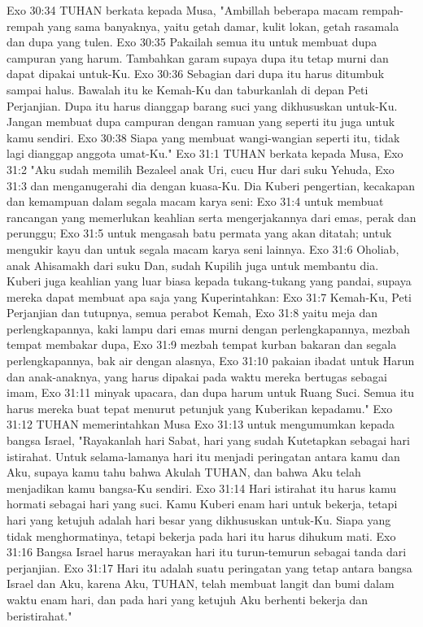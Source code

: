 Exo 30:34  TUHAN berkata kepada Musa, "Ambillah beberapa macam rempah-rempah yang sama banyaknya, yaitu getah damar, kulit lokan, getah rasamala dan dupa yang tulen.
Exo 30:35  Pakailah semua itu untuk membuat dupa campuran yang harum. Tambahkan garam supaya dupa itu tetap murni dan dapat dipakai untuk-Ku.
Exo 30:36  Sebagian dari dupa itu harus ditumbuk sampai halus. Bawalah itu ke Kemah-Ku dan taburkanlah di depan Peti Perjanjian. Dupa itu harus dianggap barang suci yang dikhususkan untuk-Ku. Jangan membuat dupa campuran dengan ramuan yang seperti itu juga untuk kamu sendiri.
Exo 30:38  Siapa yang membuat wangi-wangian seperti itu, tidak lagi dianggap anggota umat-Ku."
Exo 31:1  TUHAN berkata kepada Musa,
Exo 31:2  "Aku sudah memilih Bezaleel anak Uri, cucu Hur dari suku Yehuda,
Exo 31:3  dan menganugerahi dia dengan kuasa-Ku. Dia Kuberi pengertian, kecakapan dan kemampuan dalam segala macam karya seni:
Exo 31:4  untuk membuat rancangan yang memerlukan keahlian serta mengerjakannya dari emas, perak dan perunggu;
Exo 31:5  untuk mengasah batu permata yang akan ditatah; untuk mengukir kayu dan untuk segala macam karya seni lainnya.
Exo 31:6  Oholiab, anak Ahisamakh dari suku Dan, sudah Kupilih juga untuk membantu dia. Kuberi juga keahlian yang luar biasa kepada tukang-tukang yang pandai, supaya mereka dapat membuat apa saja yang Kuperintahkan:
Exo 31:7  Kemah-Ku, Peti Perjanjian dan tutupnya, semua perabot Kemah,
Exo 31:8  yaitu meja dan perlengkapannya, kaki lampu dari emas murni dengan perlengkapannya, mezbah tempat membakar dupa,
Exo 31:9  mezbah tempat kurban bakaran dan segala perlengkapannya, bak air dengan alasnya,
Exo 31:10  pakaian ibadat untuk Harun dan anak-anaknya, yang harus dipakai pada waktu mereka bertugas sebagai imam,
Exo 31:11  minyak upacara, dan dupa harum untuk Ruang Suci. Semua itu harus mereka buat tepat menurut petunjuk yang Kuberikan kepadamu."
Exo 31:12  TUHAN memerintahkan Musa
Exo 31:13  untuk mengumumkan kepada bangsa Israel, "Rayakanlah hari Sabat, hari yang sudah Kutetapkan sebagai hari istirahat. Untuk selama-lamanya hari itu menjadi peringatan antara kamu dan Aku, supaya kamu tahu bahwa Akulah TUHAN, dan bahwa Aku telah menjadikan kamu bangsa-Ku sendiri.
Exo 31:14  Hari istirahat itu harus kamu hormati sebagai hari yang suci. Kamu Kuberi enam hari untuk bekerja, tetapi hari yang ketujuh adalah hari besar yang dikhususkan untuk-Ku. Siapa yang tidak menghormatinya, tetapi bekerja pada hari itu harus dihukum mati.
Exo 31:16  Bangsa Israel harus merayakan hari itu turun-temurun sebagai tanda dari perjanjian.
Exo 31:17  Hari itu adalah suatu peringatan yang tetap antara bangsa Israel dan Aku, karena Aku, TUHAN, telah membuat langit dan bumi dalam waktu enam hari, dan pada hari yang ketujuh Aku berhenti bekerja dan beristirahat."
